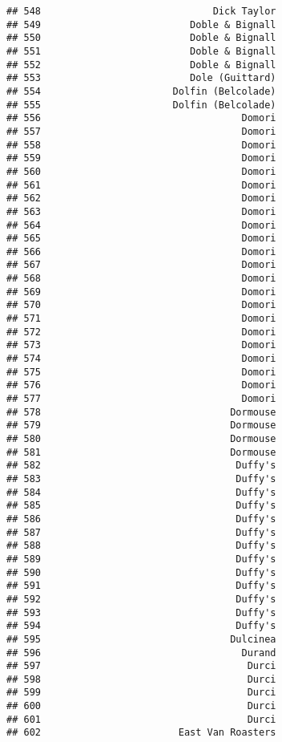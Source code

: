 \documentclass[
]{article}
\begin{document}
\begin{verbatim}
## 548                              Dick Taylor
## 549                          Doble & Bignall
## 550                          Doble & Bignall
## 551                          Doble & Bignall
## 552                          Doble & Bignall
## 553                          Dole (Guittard)
## 554                       Dolfin (Belcolade)
## 555                       Dolfin (Belcolade)
## 556                                   Domori
## 557                                   Domori
## 558                                   Domori
## 559                                   Domori
## 560                                   Domori
## 561                                   Domori
## 562                                   Domori
## 563                                   Domori
## 564                                   Domori
## 565                                   Domori
## 566                                   Domori
## 567                                   Domori
## 568                                   Domori
## 569                                   Domori
## 570                                   Domori
## 571                                   Domori
## 572                                   Domori
## 573                                   Domori
## 574                                   Domori
## 575                                   Domori
## 576                                   Domori
## 577                                   Domori
## 578                                 Dormouse
## 579                                 Dormouse
## 580                                 Dormouse
## 581                                 Dormouse
## 582                                  Duffy's
## 583                                  Duffy's
## 584                                  Duffy's
## 585                                  Duffy's
## 586                                  Duffy's
## 587                                  Duffy's
## 588                                  Duffy's
## 589                                  Duffy's
## 590                                  Duffy's
## 591                                  Duffy's
## 592                                  Duffy's
## 593                                  Duffy's
## 594                                  Duffy's
## 595                                 Dulcinea
## 596                                   Durand
## 597                                    Durci
## 598                                    Durci
## 599                                    Durci
## 600                                    Durci
## 601                                    Durci
## 602                        East Van Roasters

\end{verbatim}
\end{document}
